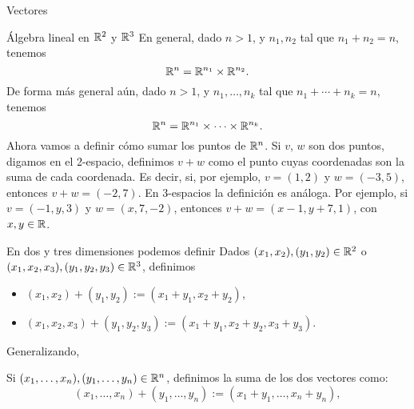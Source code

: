 \begin{chapter}{Vectores}
\begin{section}{\'Algebra lineal en $\mathbb R^2$ y $\mathbb R^3$}
        En  general, dado $n>1$, y $n_1,n_2$ tal que $n_1+n_2 = n$, tenemos
        \begin{equation*}
        \mathbb R^n= \mathbb R^{n_1} \times \mathbb R^{n_2}.
        \end{equation*} 
        De forma más general aún,  dado $n>1$, y $n_1,\ldots,n_k$ tal que $n_1+\cdots+n_k = n$, tenemos
        \begin{equation*}
        \mathbb R^n= \mathbb R^{n_1} \times \cdots\times \mathbb R^{n_k}.
        \end{equation*} 	
        Ahora vamos a definir cómo sumar los puntos de $\mathbb R^n$. Si $v$, $w$ son dos puntos, digamos en el 2-espacio,  definimos $v + w$ como el punto cuyas coordenadas son la suma de cada coordenada. Es decir, si, por ejemplo,  $v= (1, 2)$ y $w= (- 3, 5)$, entonces $v+w = (- 2, 7)$. En 3-espacios la definición es análoga. Por  ejemplo, si $v= (- 1, y, 3)$ y $w= (x, 7, - 2)$, entonces $v+w = (x - 1, y + 7, 1)$, con $x,y \in \mathbb R$.
        
        En  dos y tres dimensiones podemos definir
            Dados $(x_1,x_2), (y_1,y_2) \in \mathbb R^2$ o $(x_1,x_2,x_3), (y_1,y_2,y_3) \in \mathbb R^3$, definimos
        \begin{itemize}
            \item $(x_1,x_2)+ (y_1,y_2):=(x_1+y_1,x_2+y_2)$, 
            \item $(x_1,x_2,x_3)+ (y_1,y_2,y_3):=(x_1+y_1,x_2+y_2,x_3+y_3)$.
        \end{itemize}
        
        Generalizando, 
            \begin{definicion}\label{def-suma-en-rn}
            Si $(x_1,\ldots,x_n), (y_1,\ldots,y_n) \in \mathbb R^n$, definimos la suma de los dos vectores como: 
                    \begin{equation*}
                    (x_1,\ldots,x_n)+ (y_1,\ldots,y_n):=(x_1+y_1,\ldots,x_n+y_n), 
                \end{equation*}
            \end{definicion}
            

\end{section}
\end{chapter}
